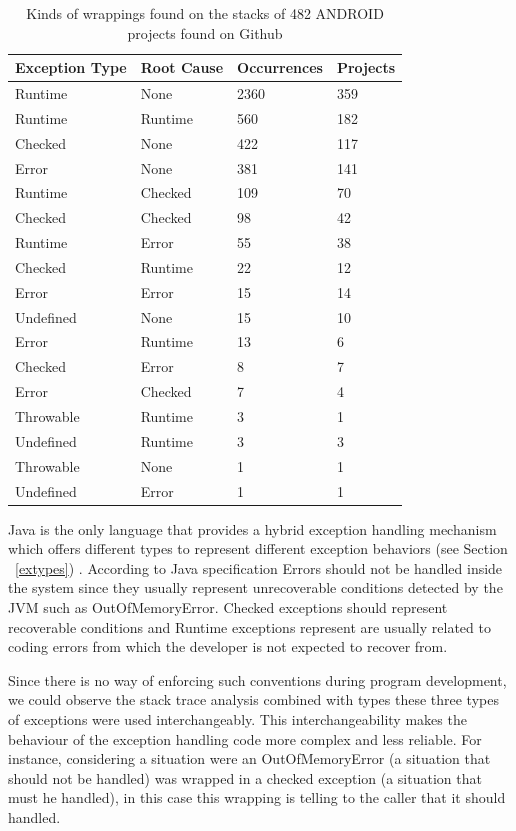 \documentclass[conference]{IEEEtran}
\begin{document}
\begin{table}
\centering
\begin{tabular}{llll}
    \hline
    \bfseries{Exception Type} & \bfseries{Root Cause} & \bfseries{Occurrences} & \bfseries{Projects} \\
    \hline
    Runtime	&	None	&	2360	&	359	\\
Runtime	&	Runtime	&	560	&	182	\\
Checked	&	None	&	422	&	117	\\
Error	&	None	&	381	&	141	\\
Runtime	&	Checked	&	109	&	70	\\
Checked	&	Checked	&	98	&	42	\\
Runtime	&	Error	&	55	&	38	\\
Checked	&	Runtime	&	22	&	12	\\
Error	&	Error	&	15	&	14	\\
Undefined	&	None	&	15	&	10	\\
Error	&	Runtime	&	13	&	6	\\
Checked	&	Error	&	8	&	7	\\
Error	&	Checked	&	7	&	4	\\
Throwable	&	Runtime	&	3	&	1	\\
Undefined	&	Runtime	&	3	&	3	\\
Throwable	&	None	&	1	&	1	\\
Undefined	&	Error	&	1	&	1	\\
    \hline
  \end{tabular}
\caption{Kinds of wrappings found on the stacks of 482 ANDROID projects found on Github}
\label{fig:wrappingandroid}
\end{table}

Java is the only language that provides a hybrid exception handling mechanism which offers different types to represent different exception behaviors (see Section ~\ref{extypes}) . According to Java specification Errors should not be handled inside the system since they usually represent unrecoverable conditions detected by the JVM such as OutOfMemoryError. Checked exceptions should represent recoverable conditions and  Runtime exceptions represent are usually related to coding errors from which the developer is not expected to recover from. 


Since there is no way of enforcing such conventions during program development,  we could observe the stack trace analysis combined with types these three types of exceptions were used interchangeably. This interchangeability makes the behaviour of the exception handling code more complex and less reliable. For instance, considering a situation were an OutOfMemoryError (a situation that should not be handled) was wrapped in a checked exception (a situation that must he handled), in this case this wrapping is telling to the caller that it should handled.
\end{document}
